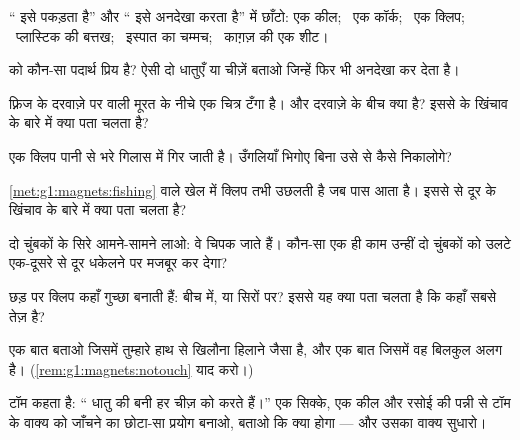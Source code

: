 \begin{exercise}[$\star$]\label{exo:g1:magnets:1}
`` इसे पकड़ता है'' और `` इसे अनदेखा करता है'' में छाँटो:
एक कील; \ एक कॉर्क; \ एक क्लिप; \ प्लास्टिक की बत्तख; \ इस्पात का
चम्मच; \ काग़ज़ की एक शीट।
\end{exercise}

\begin{exercise}[$\star$]\label{exo:g1:magnets:2}
 को कौन-सा पदार्थ प्रिय है? ऐसी दो धातुएँ या चीज़ें बताओ जिन्हें
 फिर भी अनदेखा कर देता है।
\end{exercise}

\begin{exercise}[$\star$]\label{exo:g1:magnets:3}
फ़्रिज के दरवाज़े पर  वाली मूरत के नीचे एक चित्र टँगा है। 
और दरवाज़े के बीच क्या है? इससे  के खिंचाव के बारे में क्या पता
चलता है?
\end{exercise}

\begin{exercise}[$\star$]\label{exo:g1:magnets:4}
एक क्लिप पानी से भरे गिलास में गिर जाती है। उँगलियाँ भिगोए बिना उसे
 से कैसे निकालोगे?
\end{exercise}

\begin{exercise}[$\star$]\label{exo:g1:magnets:5}
\cref{met:g1:magnets:fishing} वाले खेल में क्लिप तभी उछलती है जब
 पास आता है। इससे  से दूर के खिंचाव के बारे में क्या पता
चलता है?
\end{exercise}

\begin{exercise}[$\star$]\label{exo:g1:magnets:6}
दो चुंबकों के सिरे आमने-सामने लाओ: वे चिपक जाते हैं। कौन-सा एक ही
काम उन्हीं दो चुंबकों को उलटे एक-दूसरे से दूर धकेलने पर मजबूर कर देगा?
\end{exercise}

\begin{exercise}[$\star$]\label{exo:g1:magnets:7}
छड़  पर क्लिप कहाँ गुच्छा बनाती हैं: बीच में, या सिरों पर? इससे
यह क्या पता चलता है कि  कहाँ सबसे तेज़ है?
\end{exercise}

\begin{exercise}[$\star$]\label{exo:g1:magnets:8}
एक बात बताओ जिसमें  तुम्हारे हाथ से खिलौना हिलाने जैसा है, और
एक बात जिसमें वह बिलकुल अलग है। (\cref{rem:g1:magnets:notouch} याद
करो।)
\end{exercise}

\begin{exercise}[$\star\star$]\label{exo:g1:magnets:9}
टॉम कहता है: `` धातु की बनी हर चीज़ को  करते हैं।'' एक
सिक्के, एक कील और रसोई की पन्नी से टॉम के वाक्य को जाँचने का छोटा-सा
प्रयोग बनाओ, बताओ कि क्या होगा --- और उसका वाक्य सुधारो।
\end{exercise}
